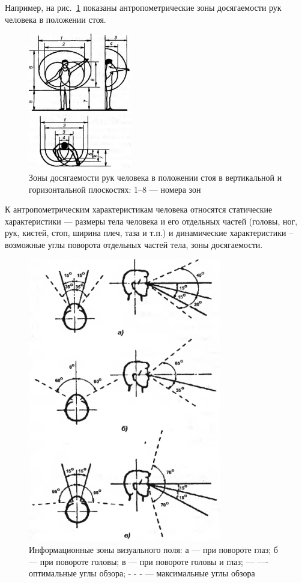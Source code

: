 Например, на рис.~\ref{access-zones} показаны антропометрические зоны досягаемости рук человека в положении стоя.

\begin{figure}
  \centering
  \includegraphics[width=0.4\textwidth]{images/devisilov-6-6}
  \caption{Зоны досягаемости рук человека в положении стоя в вертикальной и горизонтальной плоскостях: 1--8 --- номера зон\label{access-zones}}
\end{figure}

К антропометрическим характеристикам человека относятся статические характеристики --- размеры тела человека и его отдельных частей (головы, ног, рук, кистей, стоп, ширина плеч, таза и т.п.) и динамические характеристики -- возможные углы поворота отдельных частей тела, зоны досягаемости.\cite{devisilov09}

\begin{figure}
  \centering
  \includegraphics[width=0.75\textwidth]{images/devisilov-6-7}
  \caption{Информационные зоны визуального поля: а --- при повороте глаз; б --- при повороте головы; в --- при повороте головы и глаз; --- ---- оптимальные углы обзора; - - - --- максимальные углы обзора\label{visual-zones}}
\end{figure}

